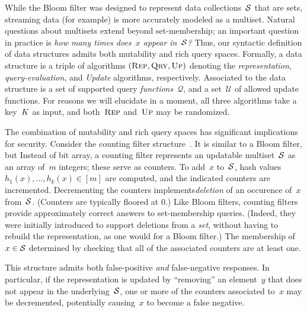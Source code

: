 %
While the Bloom filter was designed to represent data collections~$\mathcal{S}$
that are sets, streaming data (for example) is more accurately 
modeled as a multiset.  Natural questions about multisets extend beyond set-membership; an
important question in practice is \emph{how many times does~$x$ appear
in~$\mathcal{S}$?} 
Thus, our syntactic definition of data structures admits both mutability and rich
query spaces.  Formally, a data structure is a triple of algorithms $(\textnormal{\textsc{Rep}},
\textnormal{\textsc{Qry}}, \textnormal{\textsc{Up}})$ denoting the \emph{representation}, \emph{query-evaluation}, and
\emph{Update} algorithms, respectively. Associated to the data structure is a
set of supported query \emph{functions}~$\mathcal{Q}$, and a set~$\mathcal{U}$
of allowed update functions.  For reasons we will elucidate in a moment, all
three algorithms take a key~$K$ as input, and both~$\textnormal{\textsc{Rep}}$ and~$\textnormal{\textsc{Up}}$ may be
randomized.

The combination of mutability and rich query spaces has significant implications
for security. Consider the counting filter
structure~\cite{fan2000summary}.  It is similar to a Bloom filter, but 
Instead of bit array, a counting filter represents an updatable
multiset~$\mathcal{S}$ as an array of~$m$ integers; these serve as counters.
To add~$x$ to~$\mathcal{S}$, hash values $h_1(x), \ldots,
h_k(x)\in[m]$ are computed, and the indicated counters are
incremented.  Decrementing the counters implements\emph{deletion} of
an occurence of~$x$ from~$\mathcal{S}$. (Counters are typically floored at 0.)
%
Like Bloom filters, counting filters provide approximately correct
answers to set-membership queries.  (Indeed, they were initially
introduced to support deletions from a \emph{set}, without having to
rebuild the representation, as one would for a Bloom filter.) 
The membership of~$x\in\mathcal{S}$ determined by checking that all of the
associated counters are at least one.%
%

%
This structure admits both false-positive \emph{and} false-negative responses.
In particular, if the representation is updated by ``removing'' an element~$y$
that does not appear in the underlying~$\mathcal{S}$, one or more of the counters
associated to~$x$ may be decremented, potentially causing~$x$ to become a false
negative.


